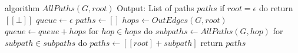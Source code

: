 \begin{Pseudocode}[float,caption={DFS-based algorithm which generates a list of all possible paths between between two nodes in a DAG},label={alg:all-paths}]
algorithm $AllPaths(G, root)	$
	Output: List of paths $paths$
	if $root = \epsilon$ do
		return $[[\bot]]$
	$queue \leftarrow \epsilon$
	$paths \leftarrow []$
	$hops \leftarrow OutEdges(G, root)$
	$queue \leftarrow queue + hops$
	for $hop \in hops$ do
		$subpaths \leftarrow AllPaths(G, hop)$
		for $subpath \in subpaths$ do
			$paths \leftarrow [[root] + subpath]$
	return $paths$
\end{Pseudocode}
